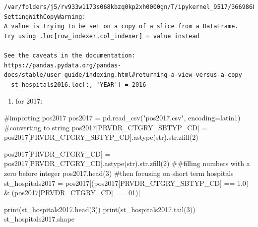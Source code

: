 \documentclass[
  letterpaper,
  DIV=11,
  numbers=noendperiod]{scrartcl}
\newenvironment{Shaded}{\begin{snugshade}}{\end{snugshade}}
\newcommand{\BuiltInTok}[1]{\textcolor[rgb]{0.00,0.23,0.31}{#1}}
\newcommand{\CommentTok}[1]{\textcolor[rgb]{0.37,0.37,0.37}{#1}}
\newcommand{\DecValTok}[1]{\textcolor[rgb]{0.68,0.00,0.00}{#1}}
\newcommand{\NormalTok}[1]{\textcolor[rgb]{0.00,0.23,0.31}{#1}}
\newcommand{\OperatorTok}[1]{\textcolor[rgb]{0.37,0.37,0.37}{#1}}
\newcommand{\StringTok}[1]{\textcolor[rgb]{0.13,0.47,0.30}{#1}}
\providecommand{\tightlist}{%
  \setlength{\itemsep}{0pt}\setlength{\parskip}{0pt}}\usepackage{longtable,booktabs,array}
\begin{document}
\begin{verbatim}
/var/folders/j5/rv933w1173s068kbzq0kp2xh0000gn/T/ipykernel_9517/3669868829.py:1: SettingWithCopyWarning: 
A value is trying to be set on a copy of a slice from a DataFrame.
Try using .loc[row_indexer,col_indexer] = value instead

See the caveats in the documentation: https://pandas.pydata.org/pandas-docs/stable/user_guide/indexing.html#returning-a-view-versus-a-copy
  st_hospitals2016.loc[:, 'YEAR'] = 2016
\end{verbatim}

\begin{enumerate}
\def\labelenumi{\arabic{enumi}.}
\setcounter{enumi}{2}
\tightlist
\item
  for 2017:
\end{enumerate}

\begin{Shaded}
\begin{Highlighting}[]
\CommentTok{\#importing pos2017}
\NormalTok{pos2017 }\OperatorTok{=}\NormalTok{ pd.read\_csv(}\StringTok{"pos2017.csv"}\NormalTok{, encoding}\OperatorTok{=}\StringTok{\textquotesingle{}latin1\textquotesingle{}}\NormalTok{)}
\CommentTok{\#converting to string}
\NormalTok{pos2017[}\StringTok{\textquotesingle{}PRVDR\_CTGRY\_SBTYP\_CD\textquotesingle{}}\NormalTok{] }\OperatorTok{=}\NormalTok{ pos2017[}\StringTok{\textquotesingle{}PRVDR\_CTGRY\_SBTYP\_CD\textquotesingle{}}\NormalTok{].astype(}\BuiltInTok{str}\NormalTok{).}\BuiltInTok{str}\NormalTok{.zfill(}\DecValTok{2}\NormalTok{)}

\NormalTok{pos2017[}\StringTok{\textquotesingle{}PRVDR\_CTGRY\_CD\textquotesingle{}}\NormalTok{] }\OperatorTok{=}\NormalTok{ pos2017[}\StringTok{\textquotesingle{}PRVDR\_CTGRY\_CD\textquotesingle{}}\NormalTok{].astype(}\BuiltInTok{str}\NormalTok{).}\BuiltInTok{str}\NormalTok{.zfill(}\DecValTok{2}\NormalTok{) }\CommentTok{\#\#filling numbers with a zero before integer}
\NormalTok{pos2017.head(}\DecValTok{3}\NormalTok{)}
\CommentTok{\#then focusing on short term hospitals }
\NormalTok{st\_hospitals2017 }\OperatorTok{=}\NormalTok{ pos2017[(pos2017[}\StringTok{\textquotesingle{}PRVDR\_CTGRY\_SBTYP\_CD\textquotesingle{}}\NormalTok{] }\OperatorTok{==} \StringTok{\textquotesingle{}1.0\textquotesingle{}}\NormalTok{) }\OperatorTok{\&}\NormalTok{ (pos2017[}\StringTok{\textquotesingle{}PRVDR\_CTGRY\_CD\textquotesingle{}}\NormalTok{] }\OperatorTok{==} \StringTok{\textquotesingle{}01\textquotesingle{}}\NormalTok{)]}

\BuiltInTok{print}\NormalTok{(st\_hospitals2017.head(}\DecValTok{3}\NormalTok{))}
\BuiltInTok{print}\NormalTok{(st\_hospitals2017.tail(}\DecValTok{3}\NormalTok{))}
\NormalTok{st\_hospitals2017.shape}
\end{Highlighting}
\end{Shaded}
\end{document}
